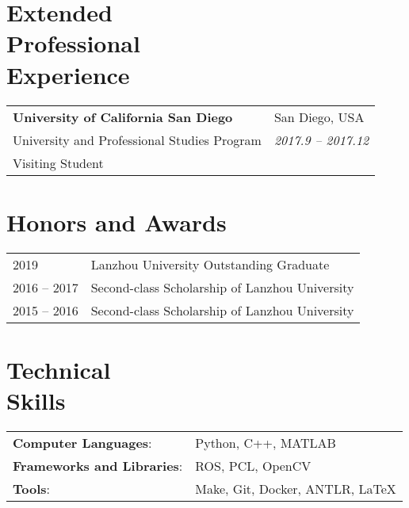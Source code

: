 \documentclass[margin,line,pifont,palatino,courier]{res}
\begin{document}
\begin{resume}
		\section{\sc Extended\\Professional\\Experience}
		
		\vspace{.05in}
		\begin{tabular}{@{}p{3.4in}p{2.0in}}
			{\bf University of California San Diego} & {\sc San Diego, USA} \\
			University and Professional Studies Program & {\sl 2017.9 -- 2017.12} \\
			Visiting Student
		\end{tabular}


		\section{\sc Honors and Awards}
		
		\begin{tabular}{@{}p{0.8in}p{4in}}
			2019 & Lanzhou University Outstanding Graduate \\
			2016 -- 2017 & Second-class Scholarship of Lanzhou University \\
			2015 -- 2016 & Second-class Scholarship of Lanzhou University \\
		\end{tabular}
		
		\section{\sc Technical\\Skills}
		
		\begin{tabular}{@{}p{2.2in}p{3in}}
			{\bf Computer Languages}: & Python, C++, MATLAB  \\
			{\bf Frameworks and Libraries}: & ROS, PCL, OpenCV\\
			{\bf Tools}: & Make, Git, Docker, ANTLR, \LaTeX
		\end{tabular}
		

\end{resume}
\end{document}
